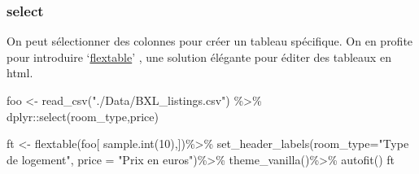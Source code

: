 \documentclass[
]{book}
\newenvironment{Shaded}{\begin{snugshade}}{\end{snugshade}}
\newcommand{\AttributeTok}[1]{\textcolor[rgb]{0.77,0.63,0.00}{#1}}
\newcommand{\DecValTok}[1]{\textcolor[rgb]{0.00,0.00,0.81}{#1}}
\newcommand{\FunctionTok}[1]{\textcolor[rgb]{0.00,0.00,0.00}{#1}}
\newcommand{\NormalTok}[1]{#1}
\newcommand{\OtherTok}[1]{\textcolor[rgb]{0.56,0.35,0.01}{#1}}
\newcommand{\SpecialCharTok}[1]{\textcolor[rgb]{0.00,0.00,0.00}{#1}}
\newcommand{\StringTok}[1]{\textcolor[rgb]{0.31,0.60,0.02}{#1}}
\begin{document}
\hypertarget{select}{%
\subsubsection{select}\label{select}}

On peut sélectionner des colonnes pour créer un tableau spécifique. On en profite pour introduire `\href{https://ardata-fr.github.io/flextable-book/index.html}{flextable}' , une solution élégante pour éditer des tableaux en html.

\begin{Shaded}
\begin{Highlighting}[]
\NormalTok{foo }\OtherTok{\textless{}{-}} \FunctionTok{read\_csv}\NormalTok{(}\StringTok{"./Data/BXL\_listings.csv"}\NormalTok{) }\SpecialCharTok{\%\textgreater{}\%}
\NormalTok{  dplyr}\SpecialCharTok{::}\FunctionTok{select}\NormalTok{(room\_type,price) }

\NormalTok{ft }\OtherTok{\textless{}{-}} \FunctionTok{flextable}\NormalTok{(foo[ }\FunctionTok{sample.int}\NormalTok{(}\DecValTok{10}\NormalTok{),])}\SpecialCharTok{\%\textgreater{}\%}
   \FunctionTok{set\_header\_labels}\NormalTok{(}\AttributeTok{room\_type=}\StringTok{"Type de logement"}\NormalTok{,}
  \AttributeTok{price =} \StringTok{"Prix en euros"}\NormalTok{)}\SpecialCharTok{\%\textgreater{}\%}
  \FunctionTok{theme\_vanilla}\NormalTok{()}\SpecialCharTok{\%\textgreater{}\%}
  \FunctionTok{autofit}\NormalTok{()}
\NormalTok{ft}
\end{Highlighting}
\end{Shaded}

\providecommand{\docline}[3]{\noalign{\global\setlength{\arrayrulewidth}{#1}}\arrayrulecolor[HTML]{#2}\cline{#3}}

\setlength{\tabcolsep}{2pt}

\renewcommand*{\arraystretch}{1.5}
\end{document}
